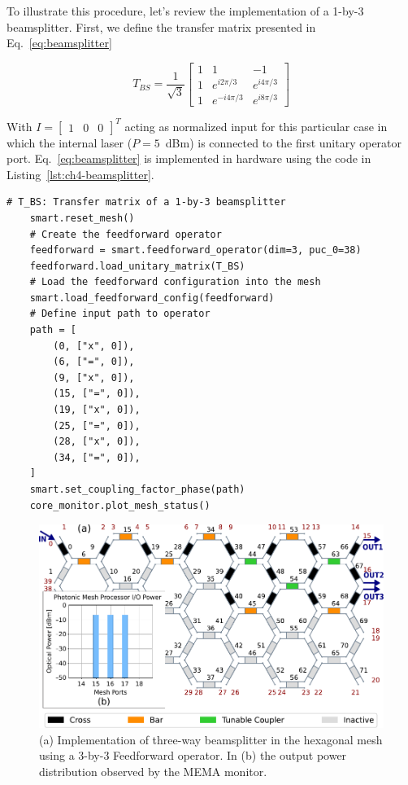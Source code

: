 To illustrate this procedure, let's review the implementation of a 1-by-3 beamsplitter.
First, we define the transfer matrix presented in Eq.~\eqref{eq:beamsplitter}

\begin{equation}
	\label{eq:beamsplitter}
	T_{BS} = \frac{1}{\sqrt{3}} \begin{bmatrix}
		1 & 1            & -1          \\
		1 & e^{i2\pi/3}  & e^{i4\pi/3} \\
		1 & e^{-i4\pi/3} & e^{i8\pi/3}
	\end{bmatrix}
\end{equation}

With \(I = \begin{bmatrix} 1 & 0 & 0 \end{bmatrix}^T\) acting as normalized input for this particular case in which the internal laser (\(P=5\)~dBm) is connected to the first unitary operator port.
Eq.~\eqref{eq:beamsplitter} is implemented in hardware using the code in Listing~\ref{lst:ch4-beamsplitter}.

\begin{lstlisting}[caption={Implementation of a three-way beamsplitter using a Feedforward operator},
label={lst:ch4-beamsplitter}]
	# T_BS: Transfer matrix of a 1-by-3 beamsplitter
	smart.reset_mesh()
	# Create the feedforward operator
	feedforward = smart.feedforward_operator(dim=3, puc_0=38)
	feedforward.load_unitary_matrix(T_BS)
	# Load the feedforward configuration into the mesh
	smart.load_feedforward_config(feedforward)
	# Define input path to operator
	path = [
		(0, ["x", 0]),
		(6, ["=", 0]),
		(9, ["x", 0]),
		(15, ["=", 0]),
		(19, ["x", 0]),
		(25, ["=", 0]),
		(28, ["x", 0]),
		(34, ["=", 0]),
	]
	smart.set_coupling_factor_phase(path)
	core_monitor.plot_mesh_status()
\end{lstlisting}

\begin{figure}
	\begin{center}
		\includegraphics{figures/ch4-3split_mema.pdf}
	\end{center}
	\caption{(a) Implementation of three-way beamsplitter in the hexagonal mesh using a 3-by-3  Feedforward
		operator.
		In (b) the output power distribution observed by the MEMA monitor.
	}\label{fig:ch4-3split} \end{figure}

